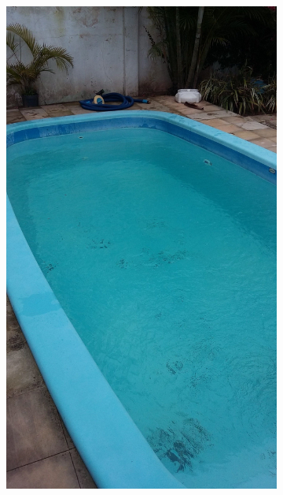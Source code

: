 \begin{figure}[H]
    \centering
    \caption{Piscina onde foram coletados os dados.}
    \label{fig:piscina}
    \begin{subfigure}[t]{0.25\textwidth}
        \includegraphics[width=\textwidth]{dados/figuras/piscina_1.jpg}
    \end{subfigure}
    \hspace{1em}
    \begin{subfigure}[t]{0.25\textwidth}

\end{subfigure}
\end{figure}
